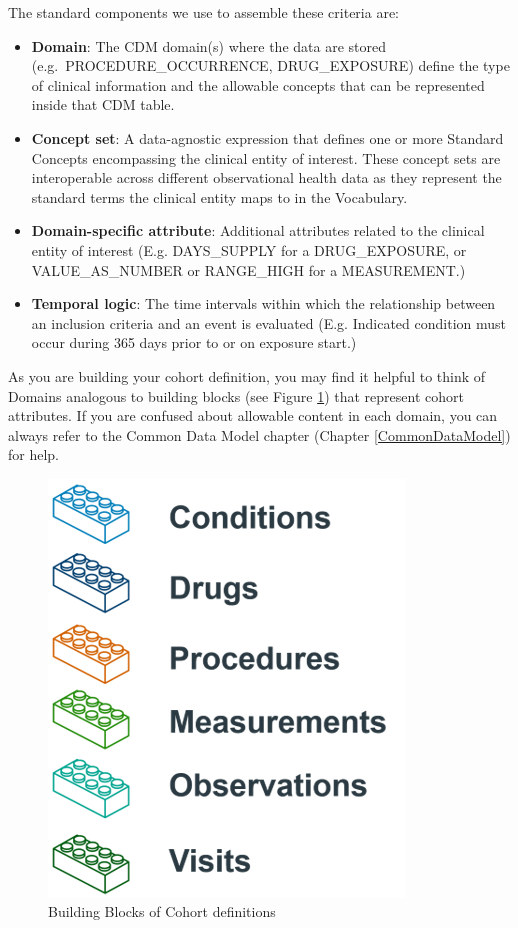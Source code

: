 \documentclass[11pt]{book}
\theoremstyle{definition}
\theoremstyle{definition}
\theoremstyle{definition}
\theoremstyle{remark}
\begin{document}
The standard components we use to assemble these criteria are:

\begin{itemize}
\item
  \textbf{Domain}: The CDM domain(s) where the data are stored (e.g.~PROCEDURE\_OCCURRENCE, DRUG\_EXPOSURE) define the type of clinical information and the allowable concepts that can be represented inside that CDM table.
\item
  \textbf{Concept set}: A data-agnostic expression that defines one or more Standard Concepts encompassing the clinical entity of interest. These concept sets are interoperable across different observational health data as they represent the standard terms the clinical entity maps to in the Vocabulary.
\item
  \textbf{Domain-specific attribute}: Additional attributes related to the clinical entity of interest (E.g. DAYS\_SUPPLY for a DRUG\_EXPOSURE, or VALUE\_AS\_NUMBER or RANGE\_HIGH for a MEASUREMENT.)
\item
  \textbf{Temporal logic}: The time intervals within which the relationship between an inclusion criteria and an event is evaluated (E.g. Indicated condition must occur during 365 days prior to or on exposure start.)
\end{itemize}

As you are building your cohort definition, you may find it helpful to think of Domains analogous to building blocks (see Figure \ref{fig:cohortLegos}) that represent cohort attributes. If you are confused about allowable content in each domain, you can always refer to the Common Data Model chapter (Chapter \ref{CommonDataModel}) for help.

\begin{figure}

{\centering \includegraphics[width=0.5\linewidth]{images/Cohorts/cohort-legos} 

}

\caption{Building Blocks of Cohort definitions}\label{fig:cohortLegos}
\end{figure}
\end{document}
